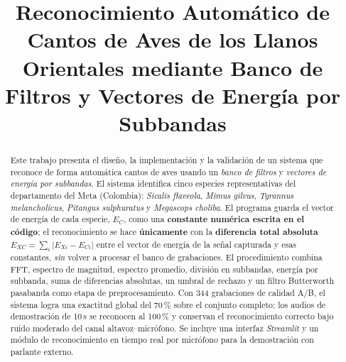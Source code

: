 \documentclass[conference]{IEEEtran}
\begin{document}
\title{Reconocimiento Automático de Cantos de Aves de los Llanos Orientales
mediante Banco de Filtros y Vectores de Energía por Subbandas}

\author{
}

\maketitle

\begin{abstract}
Este trabajo presenta el diseño, la implementación y la validación de un sistema
que reconoce de forma automática cantos de aves usando un \emph{banco de filtros}
y \emph{vectores de energía por subbandas}. El sistema identifica cinco especies
representativas del departamento del Meta (Colombia): \textit{Sicalis flaveola},
\textit{Mimus gilvus}, \textit{Tyrannus melancholicus}, \textit{Pitangus
sulphuratus} y \textit{Megascops choliba}. El programa guarda el vector de energía
de cada especie, $E_C$, como una \textbf{constante numérica escrita en el código};
el reconocimiento se hace \textbf{únicamente} con la \textbf{diferencia total
absoluta} $E_{XC}=\sum_i\lvert E_{Xi}-E_{Ci}\rvert$ entre el vector de energía de
la señal capturada y esas constantes, \emph{sin} volver a procesar el banco de
grabaciones. El procedimiento combina FFT, espectro de magnitud, espectro
promedio, división en subbandas, energía por subbanda, suma de diferencias
absolutas, un umbral de rechazo y un filtro Butterworth pasabanda como etapa de
preprocesamiento. Con 344 grabaciones de calidad A/B, el sistema logra una
exactitud global del 70\,\% sobre el conjunto completo; los audios de demostración
de 10\,s se reconocen al 100\,\% y conservan el reconocimiento correcto bajo ruido
moderado del canal altavoz--micrófono. Se incluye una interfaz \textit{Streamlit} y un módulo
de reconocimiento en tiempo real por micrófono para la demostración con parlante
externo.
\end{abstract}
\end{document}
